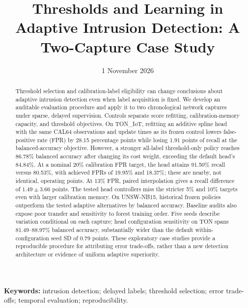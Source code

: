 
\title{\vspace{-12mm}\textbf{Thresholds and Learning in Adaptive Intrusion Detection: A Two-Capture Case Study}}

\date{1 November 2026}

\maketitle\thispagestyle{plain}
\begin{abstract}
Threshold selection and calibration-label eligibility can change conclusions about adaptive intrusion detection even when label acquisition is fixed. We develop an auditable evaluation procedure and apply it to two chronological network captures under sparse, delayed supervision. Controls separate score refitting, calibration-memory capacity, and threshold objectives. On TON\_IoT, refitting an additive spline head with the same CAL64 observations and update times as its frozen control lowers false-positive rate (FPR) by 28.15 percentage points while losing 1.91 points of recall at the balanced-accuracy objective. However, a stronger all-label threshold-only policy reaches 86.78\% balanced accuracy after changing its cost weight, exceeding the default head's 84.84\%. At a nominal 20\% calibration FPR target, the head attains 91.50\% recall versus 80.53\%, with achieved FPRs of 19.95\% and 18.37\%; these are nearby, not identical, operating points. At 13\% FPR, paired interpolation gives a recall difference of $1.49\pm3.66$ points. The tested head controllers miss the stricter 5\% and 10\% targets even with larger calibration memory. On UNSW-NB15, historical frozen policies outperform the tested adaptive alternatives by balanced accuracy. Baseline audits also expose poor transfer and sensitivity to forest training order. Five seeds describe variation conditional on each capture; head configuration sensitivity on TON spans 81.49--88.97\% balanced accuracy, substantially wider than the default within-configuration seed SD of 0.79 points. These exploratory case studies provide a reproducible procedure for attributing error trade-offs, rather than a new detection architecture or evidence of uniform adaptive superiority.
\end{abstract}
\noindent\textbf{Keywords:} intrusion detection; delayed labels; threshold selection; error trade-offs; temporal evaluation; reproducibility.

